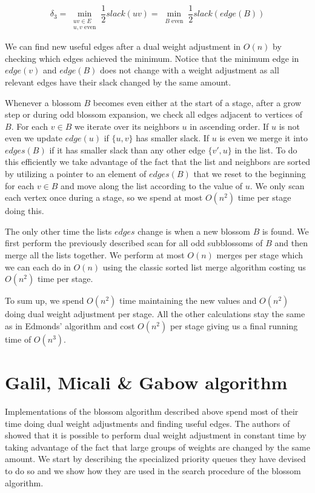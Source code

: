 \[\delta_3=\min_{\substack{uv\in E \\ \text{$u, v$ even}}} \frac{1}{2}slack(uv) = \min_{\substack{B \text{ even}}} \frac{1}{2}slack(edge(B))\] 

We can find new useful edges after a dual weight adjustment in $O(n)$ by checking which edges achieved the minimum. Notice that the minimum edge in $edge(v)$ and $edge(B)$ does not change with a weight adjustment as all relevant edges have their slack changed by the same amount.

Whenever a blossom $B$ becomes even either at the start of a stage, after a grow step or during odd blossom expansion, we check all edges adjacent to vertices of $B$. For each $v \in B$ we iterate over its neighbors $u$ in ascending order. If $u$ is not even we update $edge(u)$ if $\{u, v\}$ has smaller slack. If $u$ is even we merge it into $edges(B)$ if it has smaller slack than any other edge $\{v', u\}$ in the list. To do this efficiently we take advantage of the fact that the list and neighbors are sorted by utilizing a pointer to an element of $edges(B)$ that we reset to the beginning for each $v \in B$ and move along the list according to the value of $u$. We only scan each vertex once during a stage, so we spend at most $O(n^2)$ time per stage doing this.

The only other time the lists $edges$ change is when a new blossom $B$ is found. We first perform the previously described scan for all odd subblossoms of $B$ and then merge all the lists together. We perform at most $O(n)$ merges per stage which we can each do in $O(n)$ using the classic sorted list merge algorithm costing us $O(n^2)$ time per stage.

To sum up, we spend $O(n^2)$ time maintaining the new values and $O(n^2)$ doing dual weight adjustment per stage. All the other calculations stay the same as in Edmonds' algorithm and cost $O(n^2)$ per stage giving us a final running time of $O(n^3)$.

\section{Galil, Micali \& Gabow algorithm}

Implementations of the blossom algorithm described above spend most of their time doing dual weight adjustments and finding useful edges. The authors of~\cite{micali1980v} showed that it is possible to perform dual weight adjustment in constant time by taking advantage of the fact that large groups of weights are changed by the same amount. We start by describing the specialized priority queues they have devised to do so and we show how they are used in the search procedure of the blossom algorithm.

